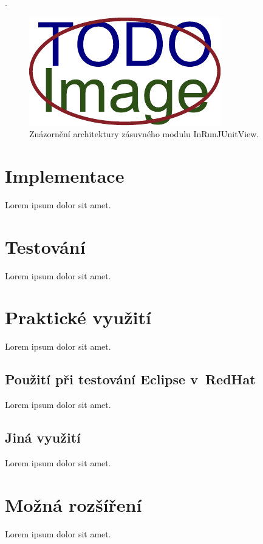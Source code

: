   .
  \begin{figure}[!h]
    \includegraphics[width=\textwidth, center]{obrazky-figures/placeholder.pdf}
    \caption{Znázornění architektury zásuvného modulu InRunJUnitView.}
    \label{fig:inrunjunitview_principle}
  \end{figure}

  
  \section{Implementace}
  Lorem ipsum dolor sit amet.
  \section{Testování}
  Lorem ipsum dolor sit amet.

  \section{Praktické využití}
  Lorem ipsum dolor sit amet.

    \subsection{Použití při testování Eclipse v~RedHat}
    Lorem ipsum dolor sit amet.

    \subsection{Jiná využití}
    Lorem ipsum dolor sit amet.

  \section{Možná rozšíření}
  Lorem ipsum dolor sit amet.

